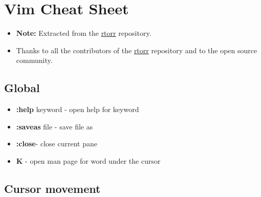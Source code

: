 \documentclass[landscape,twocolumn]{article}
\author{}
\date{}
\providecommand{\tightlist}{%
  \setlength{\itemsep}{0pt}\setlength{\parskip}{0pt}}
\begin{document}
\hypertarget{vim-cheat-sheet}{%
\section{Vim Cheat Sheet}\label{vim-cheat-sheet}}

\begin{itemize}
\item
  \textbf{Note:} Extracted from the
  \href{https://github.com/rtorr/vim-cheat-sheet}{rtorr} repository.
\item
  Thanks to all the contributors of the
  \href{https://github.com/rtorr/vim-cheat-sheet}{rtorr} repository and
  to the open source community.
\end{itemize}

\hypertarget{global}{%
\subsection{Global}\label{global}}

\begin{itemize}
\tightlist
\item
  \textbf{:help} keyword - open help for keyword
\item
  \textbf{:saveas} file - save file as
\item
  \textbf{:close}- close current pane
\item
  \textbf{K} - open man page for word under the cursor
\end{itemize}

\hypertarget{cursor-movement}{%
\subsection{Cursor movement}\label{cursor-movement}}
\end{document}
